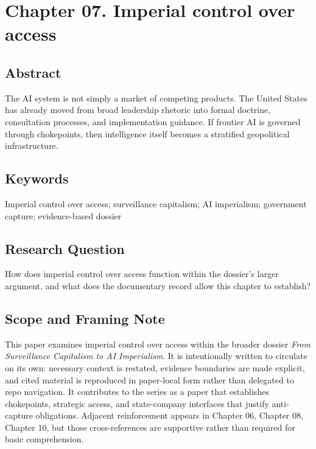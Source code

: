 \documentclass[
  american,
  11pt,
  letterpaper,
]{article}
\begin{document}
\newpage

\section{Chapter 07. Imperial control over
access}\label{chapter-07.-imperial-control-over-access}

\subsection{Abstract}\label{abstract-7}

The AI system is not simply a market of competing products. The United
States has already moved from broad leadership rhetoric into formal
doctrine, consultation processes, and implementation guidance. If
frontier AI is governed through chokepoints, then intelligence itself
becomes a stratified geopolitical infrastructure.

\subsection{Keywords}\label{keywords-7}

Imperial control over access; surveillance capitalism; AI imperialism;
government capture; evidence-based dossier

\subsection{Research Question}\label{research-question-7}

How does imperial control over access function within the dossier's
larger argument, and what does the documentary record allow this chapter
to establish?

\subsection{Scope and Framing Note}\label{scope-and-framing-note-7}

This paper examines imperial control over access within the broader
dossier \emph{From Surveillance Capitalism to AI Imperialism}. It is
intentionally written to circulate on its own: necessary context is
restated, evidence boundaries are made explicit, and cited material is
reproduced in paper-local form rather than delegated to repo navigation.
It contributes to the series as a paper that establishes chokepoints,
strategic access, and state-company interfaces that justify anti-capture
obligations. Adjacent reinforcement appears in Chapter 06, Chapter 08,
Chapter 10, but those cross-references are supportive rather than
required for basic comprehension.
\end{document}
